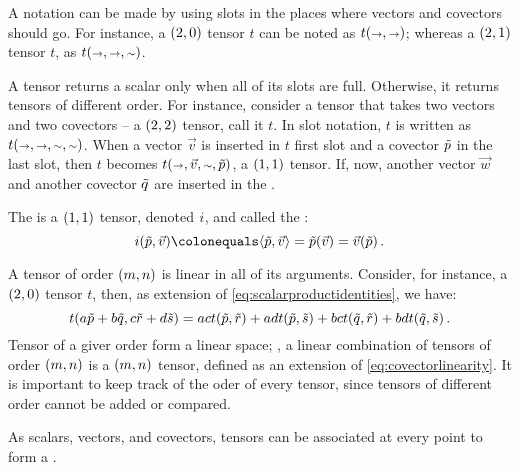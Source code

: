 \begin{remark}
  A notation can be made by using slots in the places where vectors and covectors should go. For instance, a $\torder 20$ tensor $t$ can be noted as $t\vat{\vslot,\vslot}$; whereas a $\torder 21$ tensor $t$, as $t\vat{\vslot,\vslot,\cslot}$. 
\end{remark}

\begin{remark}
  A tensor returns a scalar only when all of its slots are full. Otherwise, it returns tensors of different order. For instance, consider a tensor that takes two vectors and two covectors -- a $\torder 22$ tensor, call it $t$. In slot notation, $t$ is written as $t\vat{\vslot,\vslot,\cslot,\cslot}$. When a vector $\vec v$ is inserted in $t$ first slot and a covector $\tilde{p}$ in the last slot, then $t$ becomes $t\vat{\vslot,\vec v,\cslot,\cov p}$, a $\torder 11$ tensor. If, now, another vector $\vec w$ and another covector $\tilde{q}$ are inserted in the .
\end{remark}

The  is a $\torder 11$ tensor, denoted $i$, and called the :
%
\begin{equation}\label{eq:identitytensorproduct}
  \idtens\vat{\cov p, \vec v} \defas \sprod{\cov p}{\vec v}
                              = \cov p\vat{\vec v}
                              = \vec v\vat{\cov p}\,.
\end{equation}

A tensor of order $\torder mn$ is linear in all of its arguments. Consider, for instance, a $\torder 20$ tensor $t$, then, as extension of \cref{eq:scalarproductidentities}, we have:
%
\begin{equation*}
  t\vat{a\cov p + b\cov q, c\cov r + d\cov s} = ac t\vat{\cov p,\cov r}
                                              + ad t\vat{\cov p,\cov s}
                                              + bc t\vat{\cov q,\cov r}
                                              + bd t\vat{\cov q,\cov s}\,.
\end{equation*}
%
Tensor of a giver order form a linear space; \ie, a linear combination of tensors of order $\torder mn$ is a $\torder mn$ tensor, defined as an extension of \cref{eq:covectorlinearity}. It is important to keep track of the oder of every tensor, since tensors of different order cannot be added or compared.

As scalars, vectors, and covectors, tensors can be associated at every point to form a .

